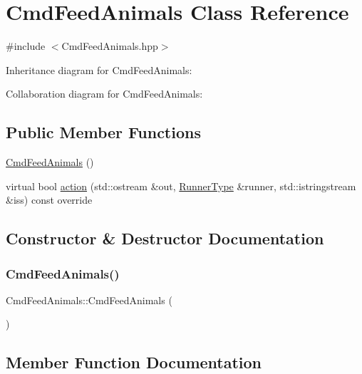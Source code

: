 \hypertarget{classCmdFeedAnimals}{}\section{Cmd\+Feed\+Animals Class Reference}
\label{classCmdFeedAnimals}


{\ttfamily \#include $<$Cmd\+Feed\+Animals.\+hpp$>$}



Inheritance diagram for Cmd\+Feed\+Animals\+:


Collaboration diagram for Cmd\+Feed\+Animals\+:
\subsection*{Public Member Functions}
\begin{DoxyCompactItemize}
\item 
\hyperlink{classCmdFeedAnimals_aa49227b5e93163e9e1f45c3a1d168e46}{Cmd\+Feed\+Animals} ()
\item 
virtual bool \hyperlink{classCmdFeedAnimals_a4127f7f32c6fd146d8f071bdbfe83182}{action} (std\+::ostream \&out, \hyperlink{Command_8hpp_a3594ceaf3c835811a9a67810e7af19f9}{Runner\+Type} \&runner, std\+::istringstream \&iss) const override
\end{DoxyCompactItemize}


\subsection{Constructor \& Destructor Documentation}
\mbox{\label{classCmdFeedAnimals_aa49227b5e93163e9e1f45c3a1d168e46}} 
\subsubsection{\texorpdfstring{Cmd\+Feed\+Animals()}{CmdFeedAnimals()}}
{\footnotesize\ttfamily Cmd\+Feed\+Animals\+::\+Cmd\+Feed\+Animals (\begin{DoxyParamCaption}{ }\end{DoxyParamCaption})}



\subsection{Member Function Documentation}
\mbox{\label{classCmdFeedAnimals_a4127f7f32c6fd146d8f071bdbfe83182}} 

